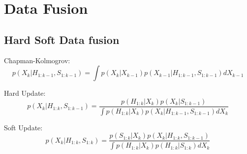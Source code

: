 \chapter{Data Fusion} \label{Chapter: Derivations}

\section{Hard Soft Data fusion}

\newcommand{\CP}[2]{\ensuremath{p(#1|#2)}} %

\newcommand{\tstamp}{\ensuremath{k}}
\newcommand{\state}{\ensuremath{X}}
\newcommand{\stateTime}{\ensuremath{\state_{\tstamp}}}
\newcommand{\stateTimePri}{\ensuremath{\state_{\tstamp-1}}}

\newcommand{\hard}{\ensuremath{H}}
\newcommand{\hardTime}{\ensuremath{\hard_\tstamp}}
\newcommand{\hardRange}[2]{\ensuremath{\hard_{#1:#2}}}
\newcommand{\hardUpToPri}{\ensuremath{\hardRange{1}{\tstamp-1}}}
\newcommand{\hardUpToTime}{\ensuremath{\hardRange{1}{\tstamp}}}

\newcommand{\soft}{\ensuremath{S}}
\newcommand{\softTime}{\ensuremath{\soft_\tstamp}}
\newcommand{\softRange}[2]{\ensuremath{\soft_{#1:#2}}}
\newcommand{\softUpToPri}{\ensuremath{\softRange{1}{\tstamp-1}}}
\newcommand{\softUpToTime}{\ensuremath{\softRange{1}{\tstamp}}}

Chapman-Kolmogrov:
\begin{equation}
\CP{\stateTime}{\hardUpToPri,\softUpToPri}= \int \CP{\stateTime}{\stateTimePri}\CP{\stateTimePri}{\hardUpToPri,\softUpToPri} d\stateTimePri
\end{equation}

Hard Update:
\begin{equation}
\CP{\stateTime}{\hardUpToTime,\softUpToPri}=\frac{\CP{\hardUpToTime}{\stateTime}\CP{\stateTime}{\softUpToPri}}{\int \CP{\hardUpToTime}{\stateTime}\CP{\stateTime}{\hardUpToPri,\softUpToPri}d\stateTime}
\end{equation}

Soft Update:
\begin{equation}
\CP{\stateTime}{\hardUpToTime,\softUpToTime}= \frac{\CP{\softUpToTime}{\stateTime}\CP{\stateTime}{\hardUpToTime, \softUpToPri}}{\int \CP{\hardUpToTime}{\stateTime}\CP{\hardUpToTime}{\softUpToTime}d\stateTime}
\end{equation}


